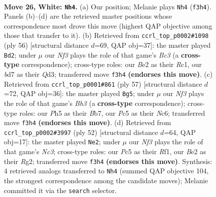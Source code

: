 \documentclass[11pt]{article}
\begin{document}
\clearpage

\begin{figure}[p]\centering
\begin{subfigure}{0.46\textwidth}\centering
\resizebox{\linewidth}{!}{%
\newchessgame
\chessboard[
  setfen={1rr3k1/1p1b1ppp/2n1p3/2Pp1q1P/p2P4/P1P2N2/R2QBPP1/2R2K2 w - - 9 26},
  showmover=false,
  pgfstyle=straightmove, color=movearrow, markmove={f3-h4}
]}
\caption{}
\end{subfigure}\hfill
\begin{subfigure}{0.46\textwidth}\centering
\resizebox{\linewidth}{!}{%
\newchessgame
\chessboard[
  setfen={r2r1bk1/1pq2pp1/2p1p2p/p2n4/P2P4/1PBQPN1P/5PP1/1RR3K1 w - - 17 29},
  showmover=false,
  pgfstyle=straightmove, color=movearrow, markmove={c3-d2}
]}
\caption{}
\end{subfigure}
\\[4pt]
\begin{subfigure}{0.46\textwidth}\centering
\resizebox{\linewidth}{!}{%
\newchessgame
\chessboard[
  setfen={3r2k1/1b2qp1p/2np2pb/4pP2/p1P1P3/1n1N3Q/1PN1B1PP/3R1R1K b - - 1 29},
  showmover=false,
  pgfstyle=straightmove, color=movearrow, markmove={h6-g5}
]}
\caption{}
\end{subfigure}\hfill
\begin{subfigure}{0.46\textwidth}\centering
\resizebox{\linewidth}{!}{%
\newchessgame
\chessboard[
  setfen={1n2rrk1/1q4pp/p2ppp2/2p5/2PbPPPP/1PN2Q2/P2B2RK/5R2 w - - 2 27},
  showmover=false,
  pgfstyle=straightmove, color=movearrow, markmove={c3-e2}
]}
\caption{}
\end{subfigure}
\caption{\textbf{Move 26, White: \texttt{Nh4}.} (a) Our position; Melanie plays \texttt{Nh4} (\texttt{f3h4}). Panels (b)--(d) are the retrieved master positions whose correspondence most drove this move (highest QAP objective among those that transfer to it). (b) Retrieved from \texttt{ccrl\_top\_p0002\#1098} (ply 56) [structural distance $d$=69, QAP obj=37]: the master played \texttt{Bd2}; under $\mu$ our \emph{Nf3} plays the role of that game's \emph{Bc3} (a \textbf{cross-type} correspondence); cross-type roles: our \emph{B}e2 as their \emph{R}c1, our \emph{b}d7 as their \emph{Q}d3; transferred move \texttt{f3h4} \textbf{(endorses this move)}. (c) Retrieved from \texttt{ccrl\_top\_p0001\#861} (ply 57) [structural distance $d$=72, QAP obj=36]: the master played \texttt{Bg5}; under $\mu$ our \emph{Nf3} plays the role of that game's \emph{Bh3} (a \textbf{cross-type} correspondence); cross-type roles: our \emph{P}h5 as their \emph{B}b7, our \emph{P}c5 as their \emph{N}c6; transferred move \texttt{f3h4} \textbf{(endorses this move)}. (d) Retrieved from \texttt{ccrl\_top\_p0002\#3997} (ply 52) [structural distance $d$=64, QAP obj=17]: the master played \texttt{Ne2}; under $\mu$ our \emph{Nf3} plays the role of that game's \emph{Nc3}; cross-type roles: our \emph{P}c5 as their \emph{R}f1, our \emph{B}e2 as their \emph{R}g2; transferred move \texttt{f3h4} \textbf{(endorses this move)}. Synthesis: 4 retrieved analogs transferred to \texttt{Nh4} (summed QAP objective 104, the strongest correspondence among the candidate moves); Melanie committed it via the \texttt{search} selector.}
\label{fig:thought-m50}
\end{figure}
\end{document}
